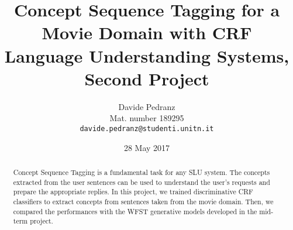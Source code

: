 \documentclass[11pt,a4paper]{article}
\title{
  Concept Sequence Tagging for a Movie Domain with CRF \\
  Language Understanding Systems, Second Project
}
\author{Davide Pedranz \\
  Mat. number 189295 \\
  {\tt davide.pedranz@studenti.unitn.it}
}
\date{28 May 2017}
\begin{document}
\maketitle

\begin{abstract}
Concept Sequence Tagging is a fundamental task for any \ac{SLU} system.
The concepts extracted from the user sentences can be used to understand the user's requests and prepare the appropriate replies.
In this project, we trained discriminative \ac{CRF} classifiers to extract concepts from sentences taken from the movie domain.
Then, we compared the performances with the \ac{WFST} generative models developed in the mid-term project.
\end{abstract}










\end{document}
